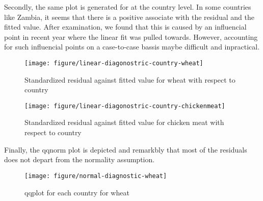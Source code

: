 \documentclass[nojss]{jss}\usepackage[]{graphicx}\usepackage[]{color}
\makeatletter
\def\maxwidth{ %
  \ifdim\Gin@nat@width>\linewidth
    \linewidth
  \else
    \Gin@nat@width
  \fi
}
\newenvironment{knitrout}{}{} %
\makeatother
\begin{document}
Secondly, the same plot is generated for at the country level. In some
countries like Zambia, it seems that there is a positive associate
with the residual and the fitted value. After examination, we found
that this is caused by an influencial point in recent year where the
linear fit was pulled towards. However, accounting for such
influencial points on a case-to-case bassis maybe difficult and
inpractical.

\begin{knitrout}
\color{fgcolor}\begin{figure}[]


{\centering \texttt{[image: figure/linear-diagonostric-country-wheat]} 

}

\caption[Standardized residual against fitted value for wheat with respect to country]{Standardized residual against fitted value for wheat with respect to country\label{fig:linear-diagonostric-country-wheat}}
\end{figure}


\end{knitrout}


\begin{knitrout}
\color{fgcolor}\begin{figure}[]


{\centering \texttt{[image: figure/linear-diagonostric-country-chickenmeat]} 

}

\caption[Standardized residual against fitted value for chicken meat with respect to country]{Standardized residual against fitted value for chicken meat with respect to country\label{fig:linear-diagonostric-country-chickenmeat}}
\end{figure}


\end{knitrout}


Finally, the qqnorm plot is depicted and remarkbly that most of the
residuals does not depart from the normality assumption.
\begin{knitrout}
\color{fgcolor}\begin{figure}[]


{\centering \texttt{[image: figure/normal-diagnostic-wheat]} 

}

\caption[qqplot for each country for wheat]{qqplot for each country for wheat\label{fig:normal-diagnostic-wheat}}
\end{figure}


\end{knitrout}
\end{document}
